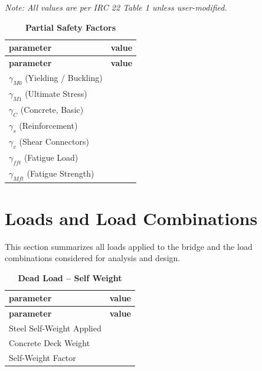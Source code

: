 \documentclass[12pt,a4paper]{report}
\numberwithin{table}{chapter}
\numberwithin{figure}{chapter}
\renewcommand{\arraystretch}{1.12}
\newcommand{\ReportSectionStyle}{\small\setlength{\tabcolsep}{3pt}\renewcommand{\arraystretch}{1.15}}
\newcommand{\ReportTableGap}{\vspace{1em}}
\newcommand{\ReportMinorGap}{\vspace{0.4em}}
\newcommand{\ReportMajorGap}{\vspace{2em}}
\begin{document}
\label{subsec:safety-factors}

\ReportMajorGap

\ReportMinorGap
\noindent\textit{Note: All values are per IRC 22 Table 1 unless user-modified.}

\ReportMinorGap
\begin{longtable}{|L{5.5cm}|p{10.0cm}|}
\caption{\textbf{Partial Safety Factors}}\\
\hline
\textbf{parameter} & \textbf{value} \\
\hline
\endfirsthead
\hline
\textbf{parameter} & \textbf{value} \\
\hline
\endhead

\textnormal{$\gamma_{M0}$ (Yielding / Buckling)} &  \\[6pt]
\hline
\textnormal{$\gamma_{M1}$ (Ultimate Stress)} &  \\[6pt]
\hline
\textnormal{$\gamma_C$ (Concrete, Basic)} &  \\[6pt]
\hline
\textnormal{$\gamma_s$ (Reinforcement)} &  \\[6pt]
\hline
\textnormal{$\gamma_v$ (Shear Connectors)} &  \\[6pt]
\hline
\textnormal{$\gamma_{fft}$ (Fatigue Load)} &  \\[6pt]
\hline
\textnormal{$\gamma_{Mft}$ (Fatigue Strength)} &  \\[6pt]
\hline
\end{longtable}

\ReportSectionStyle

\chapter{Loads and Load Combinations}

This section summarizes all loads applied to the bridge and the load combinations considered for analysis and design.

\ReportTableGap
\begin{longtable}{|L{5.5cm}|p{10.0cm}|}
\caption{\textbf{Dead Load -- Self Weight}}\\
\hline
\textbf{parameter} & \textbf{value} \\
\hline
\endfirsthead
\hline
\textbf{parameter} & \textbf{value} \\
\hline
\endhead

\textnormal{Steel Self-Weight Applied} &  \\[6pt]
\hline
\textnormal{Concrete Deck Weight} &  \\[6pt]
\hline
\textnormal{Self-Weight Factor} &  \\[6pt]
\hline
\end{longtable}
\end{document}
